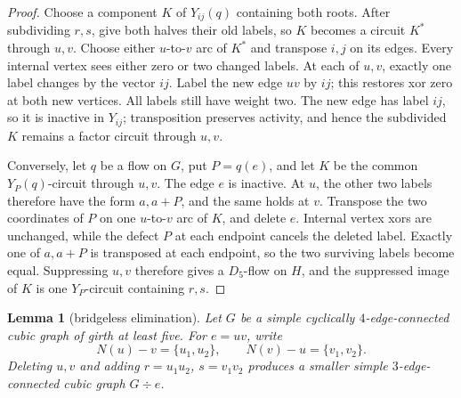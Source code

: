 \documentclass[11pt]{article}
\newtheorem{lemma}[theorem]{Lemma}
\theoremstyle{definition}
\theoremstyle{remark}
\begin{document}
\begin{proof}
Choose a component \(K\) of \(Y_{ij}(q)\) containing both roots.
After subdividing \(r,s\), give both halves their old labels, so \(K\)
becomes a circuit \(K^*\) through \(u,v\).  Choose either
\(u\)-to-\(v\) arc of \(K^*\) and transpose \(i,j\) on its edges.
Every internal vertex sees either zero or two changed labels.  At each
of \(u,v\), exactly one label changes by the vector \(ij\).  Label the
new edge \(uv\) by \(ij\); this restores xor zero at both new vertices.
All labels still have weight two.  The new edge has label \(ij\), so it
is inactive in \(Y_{ij}\); transposition preserves activity, and hence
the subdivided \(K\) remains a factor circuit through \(u,v\).

Conversely, let \(q\) be a flow on \(G\), put \(P=q(e)\), and let \(K\)
be the common \(Y_P(q)\)-circuit through \(u,v\).  The edge \(e\) is
inactive.  At \(u\), the other two labels therefore have the form
\(a,a+P\), and the same holds at \(v\).  Transpose the two coordinates
of \(P\) on one \(u\)-to-\(v\) arc of \(K\), and delete \(e\).
Internal vertex xors are unchanged, while the defect \(P\) at each
endpoint cancels the deleted label.  Exactly one of \(a,a+P\) is
transposed at each endpoint, so the two surviving labels become equal.
Suppressing \(u,v\) therefore gives a \(D_5\)-flow on \(H\), and the
suppressed image of \(K\) is one \(Y_P\)-circuit containing \(r,s\).
\end{proof}

\begin{lemma}[bridgeless elimination]\label{lem:bridgeless-elimination}
Let \(G\) be a simple cyclically \(4\)-edge-connected cubic graph of
girth at least five.  For \(e=uv\), write
\[
 N(u)-v=\{u_1,u_2\},\qquad N(v)-u=\{v_1,v_2\}.
\]
Deleting \(u,v\) and adding \(r=u_1u_2\), \(s=v_1v_2\) produces a
smaller simple \(3\)-edge-connected cubic graph \(G\div e\).
\end{lemma}
\end{document}
